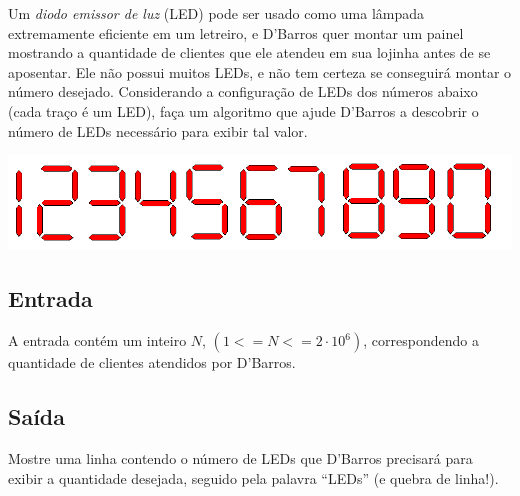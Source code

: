 %
%

Um \emph{diodo emissor de luz} (LED) pode ser usado como uma lâmpada extremamente
eficiente em um letreiro, e D'Barros quer montar um painel mostrando a quantidade
de clientes que ele atendeu em sua lojinha antes de se aposentar. Ele não possui
muitos LEDs, e não tem certeza se conseguirá montar o número desejado. Considerando
a configuração de LEDs dos números abaixo (cada traço é um LED), faça um algoritmo
que ajude D'Barros a descobrir o número de LEDs necessário para exibir tal valor.

\begin{center}
\includegraphics[width=.8\textwidth]{leds}%
\end{center}%

\subsection*{Entrada}%
A entrada contém um inteiro $N$, $(1 <= N <= 2\cdot10^6)$, correspondendo a
quantidade de clientes atendidos por D'Barros.

\subsection*{Saída}%
Mostre uma linha contendo o número de LEDs que D'Barros precisará para exibir a
quantidade desejada, seguido pela palavra ``LEDs'' (e quebra de linha!).

%